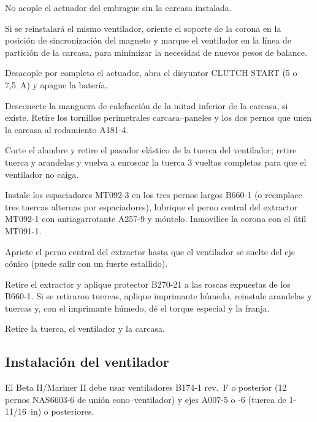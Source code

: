 \begin{precaucion}
No acople el actuador del embrague sin la carcasa instalada.
\end{precaucion}

Si se reinstalará el mismo ventilador, oriente el soporte de la corona en la posición de sincronización del magneto y marque el ventilador en la línea de partición de la carcasa, para minimizar la necesidad de nuevos pesos de balance.

\begin{pasos}
\item Desacople por completo el actuador, abra el disyuntor \textsf{CLUTCH START} (5 o 7,5~A) y apague la batería.
\item Desconecte la manguera de calefacción de la mitad inferior de la carcasa, si existe. Retire los tornillos perimetrales carcasa--paneles y los dos pernos que unen la carcasa al rodamiento A181-4.
\item Corte el alambre y retire el pasador elástico de la tuerca del ventilador; retire tuerca y arandelas y vuelva a enroscar la tuerca 3 vueltas completas para que el ventilador no caiga.
\item Instale los espaciadores MT092-3 en los tres pernos largos B660-1 (o reemplace tres tuercas alternas por espaciadores), lubrique el perno central del extractor MT092-1 con antiagarrotante A257-9 y móntelo. Inmovilice la corona con el útil MT091-1.
\item Apriete el perno central del extractor hasta que el ventilador se suelte del eje cónico (puede salir con un fuerte estallido).
\item Retire el extractor y aplique protector B270-21 a las roscas expuestas de los B660-1. Si se retiraron tuercas, aplique imprimante húmedo, reinstale arandelas y tuercas y, con el imprimante húmedo, dé el torque especial y la franja.
\item Retire la tuerca, el ventilador y la carcasa.
\end{pasos}

\subsection{Instalación del ventilador}

\begin{precaucion}
El Beta II/Mariner II debe usar ventiladores B174-1 rev.~F o posterior (12 pernos NAS6603-6 de unión cono--ventilador) y ejes A007-5 o -6 (tuerca de 1-11/16~in) o posteriores.
\end{precaucion}

